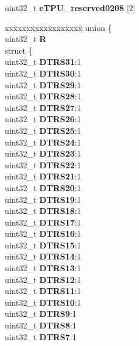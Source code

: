 \begin{DoxyCompactItemize}
\begin{tabbing}
\end{tabbing}\item 
\mbox{\label{structETPU__tag_a9dcd1ebcc23b088e9a067dd2ddeff2e5}} 
uint32\+\_\+t {\bfseries e\+T\+P\+U\+\_\+reserved0208} \mbox{[}2\mbox{]}
\item 
\mbox{\label{structETPU__tag_afcb7df34efad94ad96c12ae61b7fbd8d}} 
\begin{tabbing}
xx\=xx\=xx\=xx\=xx\=xx\=xx\=xx\=xx\=\kill
union \{\\
\>uint32\_t {\bfseries R}\\
\>struct \{\\
\>\>uint32\_t {\bfseries DTRS31}:1\\
\>\>uint32\_t {\bfseries DTRS30}:1\\
\>\>uint32\_t {\bfseries DTRS29}:1\\
\>\>uint32\_t {\bfseries DTRS28}:1\\
\>\>uint32\_t {\bfseries DTRS27}:1\\
\>\>uint32\_t {\bfseries DTRS26}:1\\
\>\>uint32\_t {\bfseries DTRS25}:1\\
\>\>uint32\_t {\bfseries DTRS24}:1\\
\>\>uint32\_t {\bfseries DTRS23}:1\\
\>\>uint32\_t {\bfseries DTRS22}:1\\
\>\>uint32\_t {\bfseries DTRS21}:1\\
\>\>uint32\_t {\bfseries DTRS20}:1\\
\>\>uint32\_t {\bfseries DTRS19}:1\\
\>\>uint32\_t {\bfseries DTRS18}:1\\
\>\>uint32\_t {\bfseries DTRS17}:1\\
\>\>uint32\_t {\bfseries DTRS16}:1\\
\>\>uint32\_t {\bfseries DTRS15}:1\\
\>\>uint32\_t {\bfseries DTRS14}:1\\
\>\>uint32\_t {\bfseries DTRS13}:1\\
\>\>uint32\_t {\bfseries DTRS12}:1\\
\>\>uint32\_t {\bfseries DTRS11}:1\\
\>\>uint32\_t {\bfseries DTRS10}:1\\
\>\>uint32\_t {\bfseries DTRS9}:1\\
\>\>uint32\_t {\bfseries DTRS8}:1\\
\>\>uint32\_t {\bfseries DTRS7}:1\\

\end{tabbing}
\end{DoxyCompactItemize}
